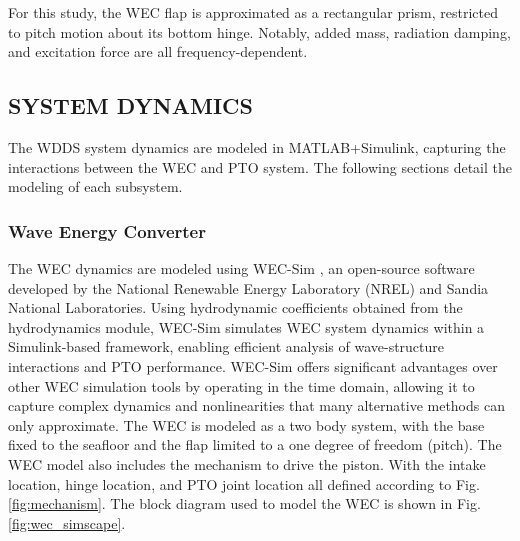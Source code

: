 \documentclass[twocolumn,10pt]{asme2e}
\begin{document}
For this study, the WEC flap is approximated as a rectangular prism, restricted to pitch motion about its bottom hinge. Notably, added mass, radiation damping, and excitation force are all frequency-dependent.


\subsection{SYSTEM DYNAMICS} \label{sec:sysdyn}

The WDDS system dynamics are modeled in MATLAB+Simulink, capturing the interactions between the WEC and PTO system. The following sections detail the modeling of each subsystem.

\subsubsection{Wave Energy Converter}

The WEC dynamics are modeled using WEC-Sim \cite{wecsim}, an open-source software developed by the National Renewable Energy Laboratory (NREL) and Sandia National Laboratories. Using hydrodynamic coefficients obtained from the hydrodynamics module, WEC-Sim simulates WEC system dynamics within a Simulink-based framework, enabling efficient analysis of wave-structure interactions and PTO performance. WEC-Sim offers significant advantages over other WEC simulation tools by operating in the time domain, allowing it to capture complex dynamics and nonlinearities that many alternative methods can only approximate. The WEC is modeled as a two body system, with the base fixed to the seafloor and the flap limited to a one degree of freedom (pitch). The WEC model also includes the mechanism to drive the piston. With the intake location, hinge location, and PTO joint location all defined according to Fig. \ref{fig:mechanism}. The block diagram used to model the WEC is shown in Fig. \ref{fig:wec_simscape}.
\end{document}
